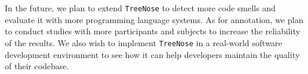 
In the future, we plan to extend \texttt{TreeNose} to detect more code smells
and evaluate it with more programming language systems. As for annotation, we
plan to conduct studies with more participants and subjects to increase the
reliability of the results. We also wish to implement \texttt{TreeNose} in a
real-world software development environment to see how it can help developers
maintain the quality of their codebase.
